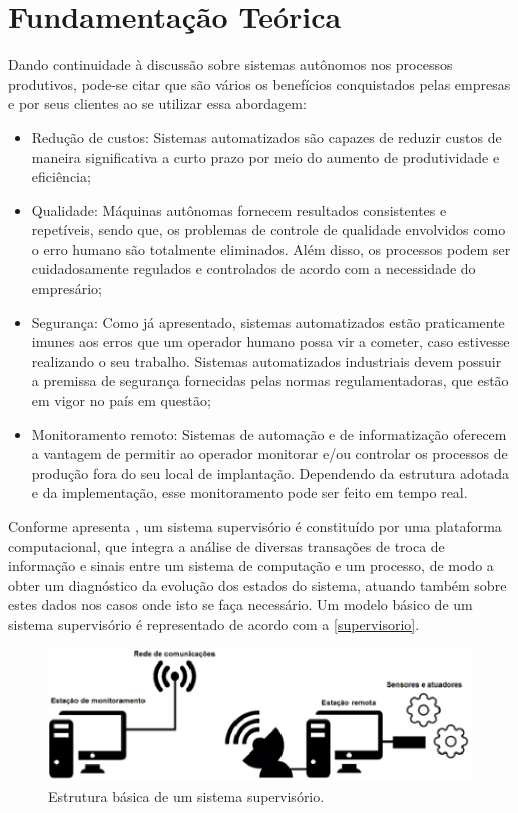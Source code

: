 
\chapter[Fundamentação Teórica]{Fundamentação Teórica}

Dando continuidade à discussão sobre sistemas autônomos nos processos produtivos, pode-se citar que são 
vários os benefícios conquistados pelas empresas e por seus clientes ao se utilizar essa abordagem: 


\begin{itemize}

	\item Redução de custos: Sistemas automatizados são capazes de reduzir custos de maneira significativa a 
curto prazo por meio do aumento de produtividade e eficiência;
	\item Qualidade: Máquinas autônomas fornecem resultados consistentes e repetíveis, sendo que, os problemas
 de controle de qualidade envolvidos como o erro humano são totalmente eliminados. Além disso, os processos podem 
ser cuidadosamente regulados e controlados de acordo com a necessidade do empresário;
	\item Segurança: Como já apresentado, sistemas automatizados estão praticamente imunes aos erros que 
um operador humano possa vir a cometer, caso estivesse realizando o seu trabalho. Sistemas automatizados industriais 
devem possuir a premissa de segurança fornecidas pelas normas regulamentadoras, que estão em vigor no país em questão;
	\item Monitoramento remoto: Sistemas de automação e de informatização oferecem a vantagem de permitir ao 
operador monitorar e/ou controlar os processos de produção fora do seu local de implantação. Dependendo da estrutura 
adotada e da implementação, esse monitoramento pode ser feito em tempo real.

\end{itemize}


Conforme apresenta \cite[p.~87]{barreto1993}, um sistema supervisório é constituído por uma plataforma computacional, 
que integra a análise de diversas transações de troca de informação e sinais entre um sistema de computação e um processo, 
de modo a obter um diagnóstico da evolução dos estados do sistema, atuando também sobre estes dados nos casos onde isto se 
faça necessário. Um modelo básico de um sistema supervisório é representado de acordo com a \autoref{supervisorio}.

\begin{figure}[h]
	\centering
	\caption{\label{supervisorio}Estrutura básica de um sistema supervisório.}
		\includegraphics[keepaspectratio=true,scale=1]{figuras/supervisorio.eps}
\end{figure}

